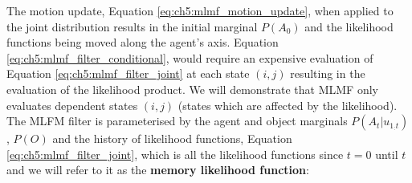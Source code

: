  
\begin{center}
%
\end{center}

 
The motion update, Equation \ref{eq:ch5:mlmf_motion_update}, when applied to the joint distribution results in the 
initial marginal $P(A_0)$ and the likelihood functions being moved along the agent's axis. Equation \ref{eq:ch5:mlmf_filter_conditional}, would 
require an expensive evaluation of Equation \ref{eq:ch5:mlmf_filter_joint} 
at each state $(i,j)$ resulting in the evaluation of the likelihood product. We will demonstrate that MLMF only evaluates dependent 
states $(i,j)$ (states which are affected by the likelihood). The MLFM filter is parameterised by the agent 
and object marginals $P(A_t|u_{1_:t})$, $P(O)$ and the history of likelihood functions, Equation \ref{eq:ch5:mlmf_filter_joint}, which 
is all the likelihood functions since $t=0$ until $t$ and we will refer to it as the \textbf{memory likelihood function}: 

